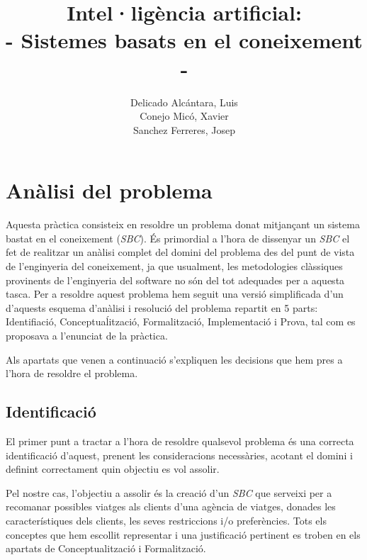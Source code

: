 \documentclass[11pt,a4paper]{article}
\author{
  Delicado Alcántara, Luis
  \\
  Conejo Micó, Xavier
  \\
  Sanchez Ferreres, Josep
}
\title{Intel·ligència artificial:\\ \large{- Sistemes basats en el coneixement -}}
\begin{document}
\maketitle

\newpage

\tableofcontents

\newpage

\section{Anàlisi del problema}
Aquesta pràctica consisteix en resoldre un problema donat mitjançant un sistema bastat en el coneixement (\emph{SBC}). És primordial a l'hora de dissenyar un \emph{SBC} el fet de realitzar un anàlisi complet del domini del problema des del punt de vista de l'enginyeria del coneixement, ja que usualment, les metodologies clàssiques provinents de l'enginyeria del software no són del tot adequades per a aquesta tasca. Per a resoldre aquest problema hem seguit una versió simplificada d'un d'aquests esquema d'anàlisi i resolució del problema repartit en 5 parts: Identifiació, Conceptuaĺització, Formalització, Implementació i Prova, tal com es proposava a l'enunciat de la pràctica.

Als apartats que venen a continuació s'expliquen les decisions que hem pres a l'hora de resoldre el problema.

\subsection{Identificació}
El primer punt a tractar a l'hora de resoldre qualsevol problema és una correcta identificació d'aquest, prenent les consideracions necessàries, acotant el domini i definint correctament quin objectiu es vol assolir.

Pel nostre cas, l'objectiu a assolir és la creació d'un \emph{SBC} que serveixi per a recomanar possibles viatges als clients d'una agència de viatges, donades les característiques dels clients, les seves restriccions i/o preferències. Tots els conceptes que hem escollit representar i una justificació pertinent es troben en els apartats de Conceptualització i Formalització.
\end{document}

